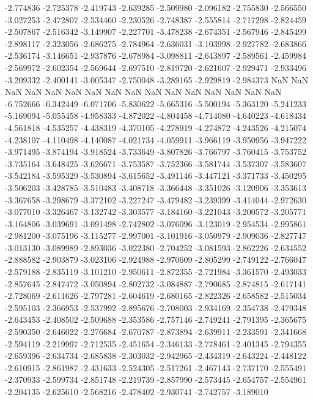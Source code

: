 -2.774836
-2.725378
-2.419743
-2.639285
-2.509980
-2.096182
-2.755830
-2.566550
-3.027253
-2.472807
-2.534460
-2.230526
-2.748387
-2.555814
-2.717298
-2.824459
-2.507867
-2.516342
-3.149907
-2.227701
-3.478238
-2.674351
-2.567946
-2.845499
-2.898117
-2.323056
-2.686275
-2.784964
-2.636031
-3.103998
-2.927782
-2.683866
-2.536174
-3.146651
-2.937876
-2.678984
-3.098811
-2.643897
-2.589561
-2.459984
-2.569972
-2.602354
-2.569644
-2.697510
-2.819720
-2.621607
-2.929471
-2.933496
-3.209332
-2.400141
-3.005347
-2.750048
-3.289165
-2.929819
-2.984373
NaN
NaN
NaN
NaN
NaN
NaN
NaN
NaN
NaN
NaN
NaN
NaN
NaN
NaN
NaN
NaN
-6.752666
-6.342449
-6.071706
-5.830622
-5.665316
-5.500194
-5.363120
-5.241233
-5.169094
-5.055458
-4.958333
-4.872022
-4.804458
-4.714080
-4.640223
-4.618434
-4.561818
-4.535257
-4.438319
-4.370105
-4.278919
-4.274872
-4.243526
-4.215074
-4.238107
-4.110498
-4.140087
-4.021734
-4.059911
-3.966119
-3.950956
-3.947222
-3.971495
-3.874194
-3.918524
-3.733649
-3.807826
-3.766797
-3.760415
-3.753752
-3.735164
-3.648425
-3.626671
-3.753587
-3.752366
-3.581744
-3.537307
-3.583607
-3.542184
-3.595329
-3.530894
-3.615652
-3.491146
-3.447121
-3.371733
-3.450295
-3.506203
-3.428785
-3.510483
-3.408718
-3.366448
-3.351026
-3.120906
-3.353613
-3.367658
-3.298679
-3.372102
-3.227247
-3.479482
-3.239399
-3.414044
-2.972630
-3.077010
-3.326467
-3.132742
-3.303577
-3.184160
-3.221043
-3.200572
-3.205771
-3.164806
-3.039691
-3.091498
-2.742802
-3.076096
-3.123019
-2.954534
-2.995861
-2.981200
-3.075196
-3.115277
-2.997001
-3.101916
-3.050979
-2.909036
-2.827747
-3.013130
-3.089989
-2.893036
-3.022380
-2.704252
-3.081593
-2.862226
-2.634552
-2.888582
-2.903879
-3.023106
-2.924988
-2.970609
-2.805299
-2.749122
-2.766047
-2.579188
-2.835119
-3.101210
-2.950611
-2.872355
-2.721984
-3.361570
-2.493033
-2.857645
-2.847472
-3.050894
-2.802732
-3.084887
-2.790685
-2.874815
-2.617141
-2.728069
-2.611626
-2.797281
-2.604619
-2.680165
-2.822326
-2.658582
-2.515034
-2.595103
-2.366953
-2.537992
-2.895676
-2.708003
-2.934169
-2.354738
-2.479348
-2.643453
-2.408502
-2.509688
-2.353586
-2.757146
-2.749241
-2.791395
-2.365675
-2.590350
-2.646022
-2.276684
-2.670787
-2.873894
-2.639911
-2.233591
-2.341668
-2.594119
-2.219997
-2.712535
-2.451654
-2.346133
-2.778461
-2.401345
-2.794355
-2.659396
-2.634734
-2.685838
-2.303032
-2.942965
-2.434319
-2.643224
-2.448122
-2.610915
-2.861987
-2.431633
-2.524305
-2.517261
-2.467143
-2.737170
-2.555491
-2.370933
-2.599734
-2.851748
-2.219739
-2.857990
-2.573445
-2.654757
-2.554961
-2.204135
-2.625610
-2.568216
-2.478402
-2.930741
-2.742757
-3.189010
